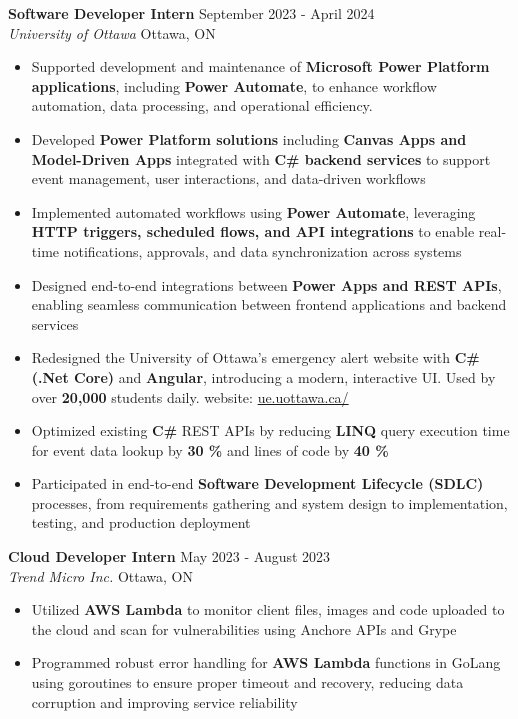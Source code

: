 \documentclass[a4paper]{article}
\begin{document}
\textbf{Software Developer Intern} \hfill September 2023 - April 2024\\
\textit{University of Ottawa} \hfill Ottawa, ON\\
\vspace{-2mm}
\begin{itemize} \itemsep -2pt

    \item Supported development and maintenance of \textbf{Microsoft Power Platform applications}, including \textbf{Power Automate}, to enhance workflow automation, data processing, and operational efficiency.

    \item Developed \textbf{Power Platform solutions} including \textbf{Canvas Apps and Model-Driven Apps} integrated with \textbf{C\# backend services} to support event management, user interactions, and data-driven workflows

    \item Implemented automated workflows using \textbf{Power Automate}, leveraging \textbf{HTTP triggers, scheduled flows, and API integrations} to enable real-time notifications, approvals, and data synchronization across systems

    \item Designed end-to-end integrations between \textbf{Power Apps and REST APIs}, enabling seamless communication between frontend applications and backend services

    \item Redesigned the University of Ottawa's emergency alert website with \textbf{C\# (.Net Core)} and \textbf{Angular}, introducing a modern, interactive UI. Used by over \textbf{20,000} students daily.
    website: \href{https://ue.uottawa.ca/}{ue.uottawa.ca/}

    \item Optimized existing \textbf{C\#} REST APIs by reducing \textbf{LINQ} query execution time for event data lookup by \textbf{30 \%} and lines of code by \textbf{40 \%}
    
    \item Participated in end-to-end \textbf{Software Development Lifecycle (SDLC)} processes, from requirements gathering and system design to implementation, testing, and production deployment
\end{itemize}

\textbf{Cloud Developer Intern} \hfill May 2023 - August 2023\\
\textit{Trend Micro Inc.} \hfill Ottawa, ON\\
\vspace{-2mm}
\begin{itemize} \itemsep -2pt
    \item Utilized \textbf{AWS Lambda} to monitor client files, images and code uploaded to the cloud and scan for vulnerabilities using Anchore APIs and Grype
        \item Programmed robust error handling for \textbf{AWS Lambda} functions in GoLang using goroutines to ensure proper timeout and recovery, reducing data corruption and improving service reliability
\end{itemize}
\end{document}
